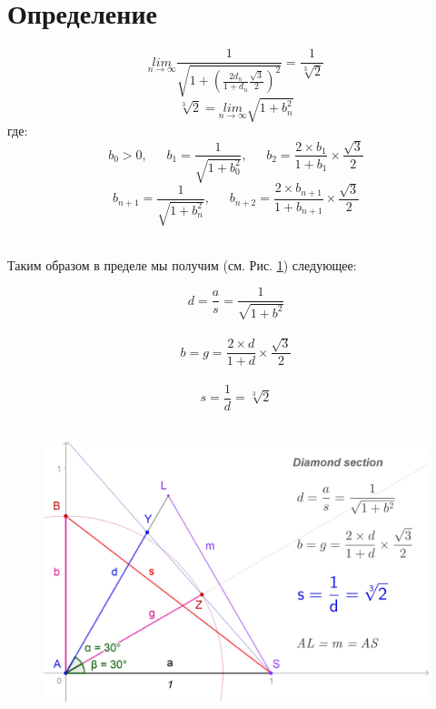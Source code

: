 \documentclass[12pt, letterpaper, oneside]{report}
\begin{document}
\section{Определение}
\begin{equation}
\underset{n\to \infty }{lim} \dfrac{1}{\sqrt{1+\left(\frac{2 d_{n}}{1+d_{n}}\frac{\sqrt{3}}{2}\right)^{2}}}=\dfrac{1}{\sqrt[3]{2}}
\end{equation}
\vspace{30pt}
\begin{equation}
\sqrt[3]{2}= \underset{n\to \infty }{lim} \sqrt{1+b_{n}^{2}}
\end{equation}
где:   
\begin{equation}
b_{0} > 0,\ \hspace{15pt} b_{1}=\dfrac{1}{\sqrt{1+b_{0}^{2}}},\ \hspace{15pt} b_{2}=\frac{2\times b_{1}}{1+b_{1}}\times\frac{\sqrt{3}}{2}
\end{equation}
\begin{equation}
b_{n+1}=\dfrac{1}{\sqrt{1+b_{n}^{2}}},\ \hspace{15pt} b_{n+2}=\frac{2\times b_{n+1}}{1+b_{n+1}}\times\frac{\sqrt{3}}{2}
\end{equation}
\\
\begin{center}
	Таким образом в пределе мы получим (см. Рис. \ref{fig:definition}) следующее:
\end{center}
\begin{equation}
d=\frac{a}{s}=\frac{1}{\sqrt{1+b^{2}}}
\end{equation}
\\
\begin{equation}
 b=g=\frac{2\times d}{1+d}\times\frac{\sqrt{3}}{2}
\end{equation}
\\
\begin{equation}
s=\dfrac{1}{d}=\sqrt[3]{2}
\end{equation}
\\
\begin{figure}[h]
	\centering
	\includegraphics[width=0.7\linewidth]{images/ds_new_def.jpg}
	\caption{}
	\label{fig:definition}
\end{figure}
\end{document}
